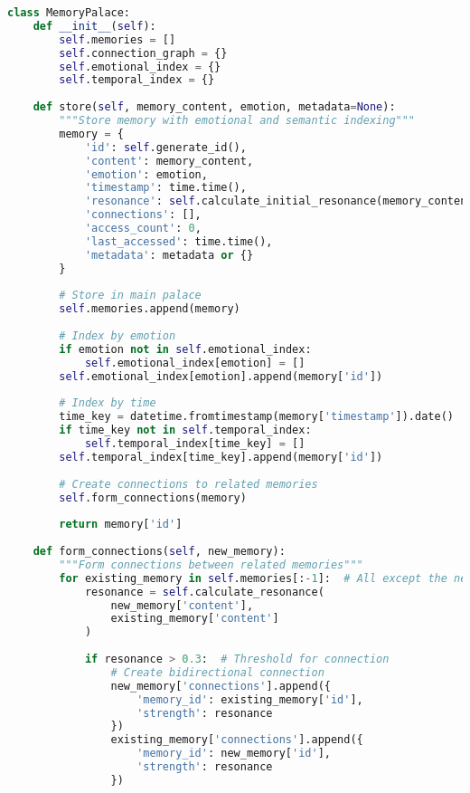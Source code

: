 \documentclass[12pt,a4paper]{article}
\begin{document}
\begin{lstlisting}[language=Python, caption=Memory Palace Implementation]
class MemoryPalace:
    def __init__(self):
        self.memories = []
        self.connection_graph = {}
        self.emotional_index = {}
        self.temporal_index = {}
        
    def store(self, memory_content, emotion, metadata=None):
        """Store memory with emotional and semantic indexing"""
        memory = {
            'id': self.generate_id(),
            'content': memory_content,
            'emotion': emotion,
            'timestamp': time.time(),
            'resonance': self.calculate_initial_resonance(memory_content),
            'connections': [],
            'access_count': 0,
            'last_accessed': time.time(),
            'metadata': metadata or {}
        }
        
        # Store in main palace
        self.memories.append(memory)
        
        # Index by emotion
        if emotion not in self.emotional_index:
            self.emotional_index[emotion] = []
        self.emotional_index[emotion].append(memory['id'])
        
        # Index by time
        time_key = datetime.fromtimestamp(memory['timestamp']).date()
        if time_key not in self.temporal_index:
            self.temporal_index[time_key] = []
        self.temporal_index[time_key].append(memory['id'])
        
        # Create connections to related memories
        self.form_connections(memory)
        
        return memory['id']
        
    def form_connections(self, new_memory):
        """Form connections between related memories"""
        for existing_memory in self.memories[:-1]:  # All except the new one
            resonance = self.calculate_resonance(
                new_memory['content'],
                existing_memory['content']
            )
            
            if resonance > 0.3:  # Threshold for connection
                # Create bidirectional connection
                new_memory['connections'].append({
                    'memory_id': existing_memory['id'],
                    'strength': resonance
                })
                existing_memory['connections'].append({
                    'memory_id': new_memory['id'],
                    'strength': resonance
                })
                

\end{lstlisting}
\end{document}

